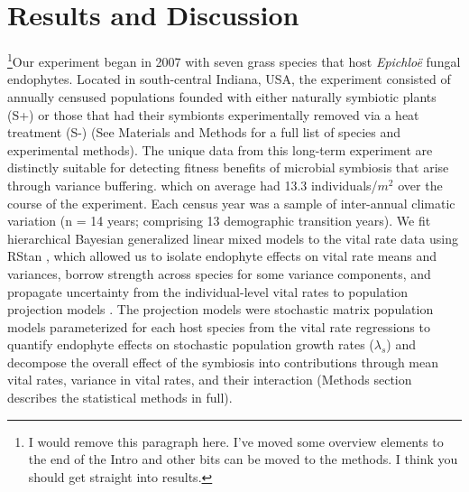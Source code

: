 \documentclass[9pt,twocolumn,twoside]{pnas-new}
\begin{document}
\section*{Results and Discussion}
\footnote{I would remove this paragraph here. I've moved some overview elements to the end of the Intro and other bits can be moved to the methods. I think you should get straight into results.}Our experiment began in 2007 with seven grass species that host \emph{Epichlo\"{e}} fungal endophytes. 
Located in south-central Indiana, USA, the experiment consisted of annually censused populations founded with either naturally symbiotic plants (S+) or those that had their symbionts experimentally removed via a heat treatment (S-) (See Materials and Methods for a full list of species and experimental methods).
The unique data from this long-term experiment are distinctly suitable for detecting fitness benefits of microbial symbiosis that arise through variance buffering. 
 which on average had 13.3 individuals/$m^2$ over the course of the experiment. 
Each census year was a sample of inter-annual climatic variation (n = 14 years; comprising 13 demographic transition years).
We fit hierarchical Bayesian generalized linear mixed models to the vital rate data using RStan \cite{rstan2022}, which allowed us to isolate endophyte effects on vital rate means and variances, borrow strength across species for some variance components, and propagate uncertainty from the individual-level vital rates to population projection models \cite{elderd2016quantifying}. 
The projection models were stochastic matrix population models parameterized for each host species from the vital rate regressions to quantify endophyte effects on stochastic population growth rates ($\lambda_s$) and decompose the overall effect of the symbiosis into contributions through mean vital rates, variance in vital rates, and their interaction (Methods section describes the statistical methods in full).
\end{document}
